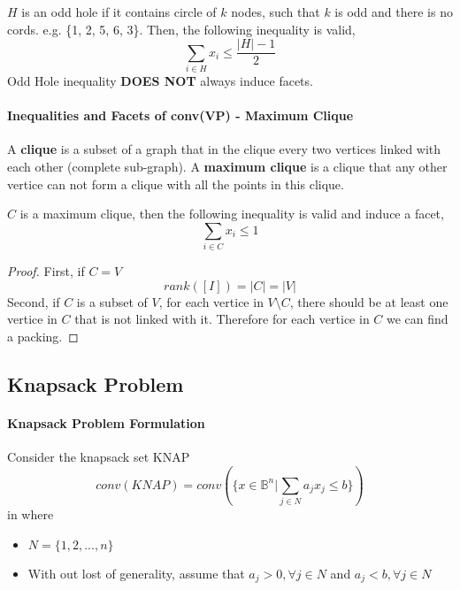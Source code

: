                 $H$ is an odd hole if it contains circle of $k$ nodes, such that $k$ is odd and there is no cords. e.g. \{1, 2, 5, 6, 3\}. Then, the following inequality is valid,
                \begin{equation*}
                    \sum_{i\in H}x_i\le \frac{|H|-1}2 \nonumber
                \end{equation*}
                Odd Hole inequality \textbf{DOES NOT} always induce facets.

            \paragraph{Inequalities and Facets of conv(VP) - Maximum Clique}
                A \textbf{clique} is a subset of a graph that in the clique every two vertices linked with each other (complete sub-graph). A \textbf{maximum clique} is a clique that any other vertice can not form a clique with all the points in this clique.

                $C$ is a maximum clique, then the following inequality is valid and induce a facet,
                \begin{equation*}
                    \sum_{i\in C} x_i \le 1 \nonumber
                \end{equation*}
                
                \begin{proof}
                    First, if $C=V$
                    \begin{equation*}
                        rank\left(\left[I\right]\right) = |C| = |V| \nonumber           
                    \end{equation*}
                    Second, if $C$ is a subset of $V$, for each vertice in $V \setminus C$, there should be at least one vertice in $C$ that is not linked with it. Therefore for each vertice in $C$ we can find a packing.
                \end{proof}                    

        \subsection{Knapsack Problem}
            \paragraph{Knapsack Problem Formulation}
                Consider the knapsack set KNAP
                \begin{equation*}conv(KNAP)= conv(\{x\in \mathbb{B}^n|\sum_{j\in N}a_jx_j\le b\})\end{equation*}
                in where
                \begin{itemize}
                    \item $N = \{1, 2, ..., n\}$
                    \item With out lost of generality, assume that $a_j > 0, \forall j \in N$ and $a_j < b, \forall j \in N$
                \end{itemize}

